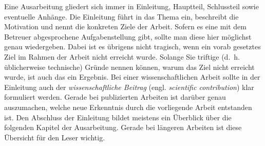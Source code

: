 Eine Ausarbeitung gliedert sich immer in Einleitung, Hauptteil, Schlussteil sowie eventuelle Anhänge.
Die Einleitung führt in das Thema ein, beschreibt die Motivation und nennt die konkreten Ziele der Arbeit.
Sofern es eine mit dem Betreuer abgesprochene Aufgabenstellung gibt, sollte man diese hier möglichst genau wiedergeben.
Dabei ist es übrigens nicht tragisch, wenn ein vorab gesetztes Ziel im Rahmen der Arbeit nicht erreicht wurde.
Solange Sie triftige (d.~h. üblicherweise technische) Gründe nennen können, warum das Ziel nicht erreicht wurde, ist auch das ein Ergebnis.
Bei einer wissenschaftlichen Arbeit sollte in der Einleitung auch der \textit{wissenschaftliche Beitrag} (engl. \textit{scientific contribution}) klar formuliert werden.
Gerade bei publizierten Arbeiten ist darüber genau auszumachen, welche neue Erkenntnis durch die vorliegende Arbeit entstanden ist.
Den Abschluss der Einleitung bildet meistens ein Überblick über die folgenden Kapitel der Ausarbeitung. 
Gerade bei längeren Arbeiten ist diese Übersicht für den Leser wichtig.

